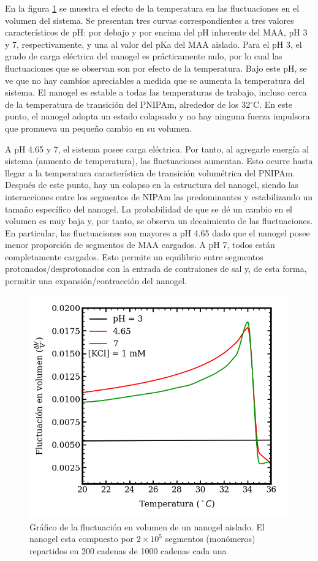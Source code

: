 	
	
	
	En la figura \ref{fig:mc:fluct-T} se muestra el efecto de la temperatura en las fluctuaciones en el volumen del sistema. Se presentan tres curvas correspondientes a tres valores caracter\'isticos de pH: por debajo y por encima del pH inherente del MAA, pH 3 y 7, respectivamente, y una al valor del pKa del MAA aislado.
	Para el pH 3, el grado de carga el\'ectrica del nanogel es pr\'acticamente nulo, por lo cual las fluctuaciones que se observan son por efecto de la temperatura. Bajo este pH, se ve que no hay cambios apreciables a medida que se aumenta la temperatura del sistema. El nanogel es estable a todas las temperaturas de trabajo, incluso cerca de la temperatura de transici\'on del PNIPAm, alrededor de los 32$^\circ$C. En este punto, el nanogel adopta un estado colapsado y no hay ninguna fuerza impulsora que promueva un peque\~no cambio en su volumen.
	
	A pH 4.65 y 7, el sistema posee carga el\'ectrica. Por tanto, al agregarle energ\'ia al sistema (aumento de temperatura), las fluctuaciones aumentan. Esto ocurre hasta llegar a la temperatura caracter\'istica de transici\'on volum\'etrica del PNIPAm. Despu\'es de este punto, hay un colapso en la estructura del nanogel, siendo las interacciones entre los segmentos de NIPAm las predominantes y estabilizando un tama\~no espec\'ifico del nanogel.
	La probabilidad de que se d\'e un cambio en el volumen es muy baja y, por tanto, se observa un decaimiento de las fluctuaciones.
	En particular, las fluctuaciones son mayores a pH 4.65 dado que el nanogel posee menor proporci\'on de segmentos de MAA cargados. A pH 7, todos est\'an completamente cargados. Esto permite un equilibrio entre segmentos protonados/desprotonados con la entrada de contraiones de sal y, de esta forma, permitir una expansi\'on/contracci\'on del nanogel.
	
	
	
	\begin{figure}
		\centering
		\includegraphics[width=0.45\linewidth]{Figures/graph-mc/fluct-T.png}
		\caption{Gr\'afico de la fluctuaci\'on en volumen de un nanogel aislado. El nanogel esta compuesto por $2\times 10^5$ segmentos (mon\'omeros) repartidos en 200 cadenas de 1000 cadenas cada una}
		\label{fig:mc:fluct-T}
	\end{figure}
	
